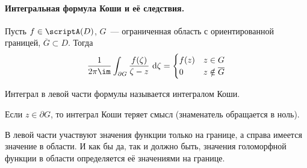 \documentclass{article}
\begin{document}
    \paragraph{Интегральная формула Коши и её следствия.}
    \begin{theorem}
        \label{Интегральная формула Коши}
        Пусть $f\in\scriptA(D)$, $G$~--- ограниченная область с ориентированной границей, $\overline G\subset D$. Тогда
        $$
        \frac1{2\pi\im}\int_{\partial G}\frac{f(\zeta)}{\zeta-z}~\mathrm d\zeta=\begin{cases}
            f(z)&z\in G\\
            0&z\notin\overline G
        \end{cases}
        $$
    \end{theorem}
    \begin{remark}
        Интеграл в левой части формулы называется интегралом Коши.
    \end{remark}
    \begin{remark}
        Если $z\in\partial G$, то интеграл Коши теряет смысл (знаменатель обращается в ноль).
    \end{remark}
    \begin{remark}
        В левой части участвуют значения функции только на границе, а справа имеется значение в области. И как бы да, так и должно быть, значения голоморфной функции в области определяется её значениями на границе.
    \end{remark}
\end{document}
